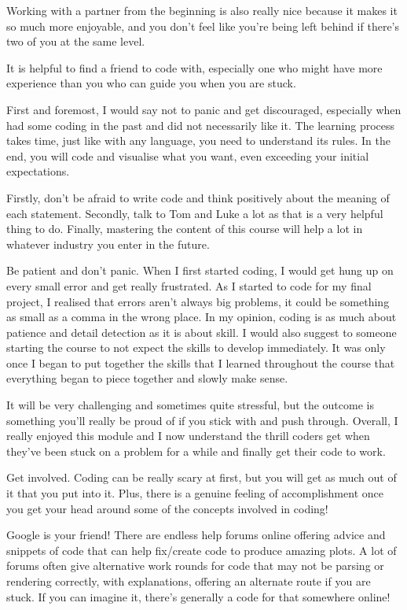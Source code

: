 \documentclass[
]{book}
\begin{document}
Working with a partner from the beginning is also really nice because it makes it so much more enjoyable, and you don't feel like you're being left behind if there's two of you at the same level.

It is helpful to find a friend to code with, especially one who might have more experience than you who can guide you when you are stuck.

First and foremost, I would say not to panic and get discouraged, especially when had some coding in the past and did not necessarily like it. The learning process takes time, just like with any language, you need to understand its rules. In the end, you will code and visualise what you want, even exceeding your initial expectations.

Firstly, don't be afraid to write code and think positively about the meaning of each statement. Secondly, talk to Tom and Luke a lot as that is a very helpful thing to do. Finally, mastering the content of this course will help a lot in whatever industry you enter in the future.

Be patient and don't panic. When I first started coding, I would get hung up on every small error and get really frustrated. As I started to code for my final project, I realised that errors aren't always big problems, it could be something as small as a comma in the wrong place. In my opinion, coding is as much about patience and detail detection as it is about skill. I would also suggest to someone starting the course to not expect the skills to develop immediately. It was only once I began to put together the skills that I learned throughout the course that everything began to piece together and slowly make sense.

It will be very challenging and sometimes quite stressful, but the outcome is something you'll really be proud of if you stick with and push through. Overall, I really enjoyed this module and I now understand the thrill coders get when they've been stuck on a problem for a while and finally get their code to work.

Get involved. Coding can be really scary at first, but you will get as much out of it that you put into it. Plus, there is a genuine feeling of accomplishment once you get your head around some of the concepts involved in coding!

Google is your friend! There are endless help forums online offering advice and snippets of code that can help fix/create code to produce amazing plots. A lot of forums often give alternative work rounds for code that may not be parsing or rendering correctly, with explanations, offering an alternate route if you are stuck. If you can imagine it, there's generally a code for that somewhere online!
\end{document}
